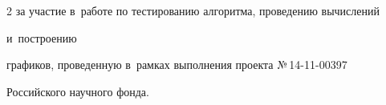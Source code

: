 \begin{multicols}{2}
за участие в~работе по тес\-ти\-ро\-ва\-нию алгоритма, проведению вычислений\linebreak


 и~построению 


графиков, проведенную в~рамках выполнения проекта №\,14-11-00397 


Российского научного фонда.





\pagebreak














\end{multicols}





